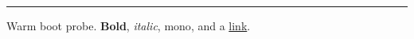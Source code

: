 \documentclass{article}
\begin{document}
{\color{cvaccent}\rule{\linewidth}{1.1pt}}

Warm boot probe. \textbf{Bold}, \textit{italic}, {\probemono mono}, and a
\href{https://example.com}{link}.
\end{document}
